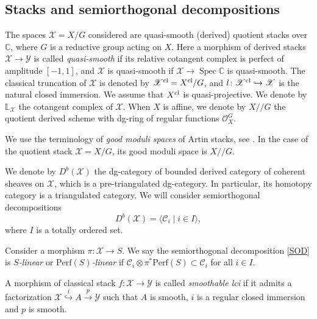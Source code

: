 \documentclass [11pt,oneside,a4paper,mathscr]{amsart}
\theoremstyle{definition}
\newcommand{\X}{\mathscr{X}}
\newcommand{\Spec}{\operatorname{Spec}}
\newcommand{\ssslash}{/\!\!/}
\begin{document}
\subsection{Stacks and semiorthogonal decompositions}\label{subsec:stacks}
The spaces $\X=X/G$ considered are quasi-smooth (derived) quotient stacks over $\mathbb{C}$, where $G$ is a reductive group acting on $X$. 
Here a morphism of derived stacks $\X \to \mathscr{Y}$ is 
called \textit{quasi-smooth} if its relative cotangent complex 
is perfect of amplitude $[-1, 1]$, and $\X$ is quasi-smooth 
if $\X \to \Spec \mathbb{C}$ is quasi-smooth. 
The classical truncation of $\X$ is denoted by 
$\X^{\rm{cl}}=X^{\rm{cl}}/G$, 
and $l \colon \X^{\rm{cl}} \hookrightarrow \X$
is the natural closed immersion. 
We assume that $X^{\rm{cl}}$ is quasi-projective. 
We denote by $\mathbb{L}_\X$ the cotangent complex of 
$\X$. 
When $X$ is affine, we denote by $X\ssslash G$ the quotient derived scheme with dg-ring of regular functions $\mathcal{O}_X^G$. 

We use the terminology of \textit{good moduli spaces} of Artin stacks, see \cite[Example 8.3]{MR3237451}.
In the case of the quotient stack $\X=X/G$, its good moduli space 
is $X\ssslash G$. 

We denote by $D^b(\X)$ the dg-category of bounded derived category of coherent 
sheaves on $\X$, which is a pre-triangulated dg-category. 
In particular, its homotopy category is a triangulated category. 
We will consider semiorthogonal decompositions \begin{equation}\label{SOD}
    D^b(\X)=\langle \mathcal{C}_i \mid i\in I\rangle,
\end{equation}
where $I$ is a totally ordered set. 

Consider a morphism $\pi\colon \X\to S$. We say the semiorthogonal decomposition \eqref{SOD} is \textit{$S$-linear} or 
\textit{$\mathrm{Perf}(S)$-linear} if $\mathcal{C}_i\otimes \pi^*\mathrm{Perf}(S)\subset \mathcal{C}_i$ for all $i\in I$. 

A morphism of classical stack $f\colon \X \to \mathscr{Y}$ is called 
\textit{smoothable lci} if it admits a factorization 
$\X \stackrel{i}{\hookrightarrow} A \stackrel{p}{\to} \mathscr{Y}$
such that $A$ is smooth, $i$ is a regular closed immersion and $p$ is smooth. 



\end{document}

